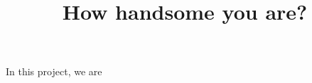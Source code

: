 \documentclass{article}
\title{How handsome you are?}
\begin{document}
	\maketitle
	In this project, we are
\end{document}
